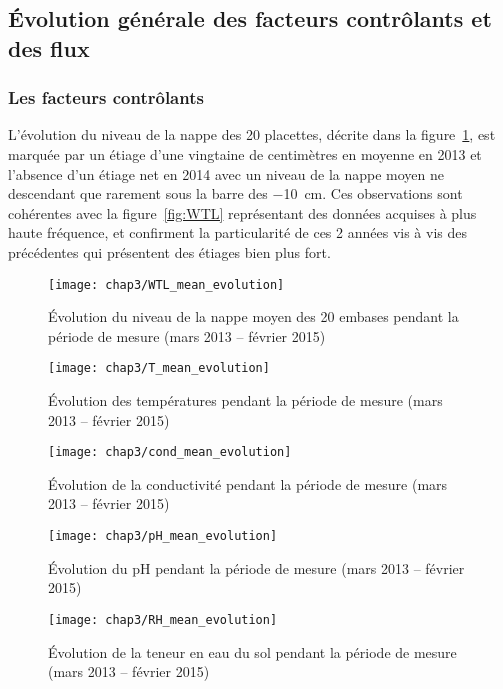 \subsection{Évolution générale des facteurs contrôlants et des flux}

\subsubsection{Les facteurs contrôlants}

L'évolution du niveau de la nappe des 20 placettes, décrite dans la figure~\ref{fig:WTL_mean_evolution}, est marquée par un étiage d'une vingtaine de centimètres en moyenne en 2013 et l'absence d'un étiage net en 2014 avec un niveau de la nappe moyen ne descendant que rarement sous la barre des \SI{-10}{\cm}.
Ces observations sont cohérentes avec la figure~\ref{fig:WTL} représentant des données acquises à plus haute fréquence, et confirment la particularité de ces 2 années vis à vis des précédentes qui présentent des étiages bien plus fort.

\begin{figure}
\centering
\texttt{[image: chap3/WTL\_mean\_evolution]}
\caption{Évolution du niveau de la nappe moyen des 20 embases pendant la période de mesure (mars 2013 -- février 2015)}
\label{fig:WTL_mean_evolution}
\end{figure}


\begin{figure}
\centering
\texttt{[image: chap3/T\_mean\_evolution]}
\caption{Évolution des températures pendant la période de mesure (mars 2013 -- février 2015)}
\label{fig:T_mean_evolution}
\end{figure}


\begin{figure}
\centering
\texttt{[image: chap3/cond\_mean\_evolution]}
\caption{Évolution de la conductivité pendant la période de mesure (mars 2013 -- février 2015)}
\label{fig:cond_mean_evolution}
\end{figure}

\begin{figure}
\centering
\texttt{[image: chap3/pH\_mean\_evolution]}
\caption{Évolution du pH pendant la période de mesure (mars 2013 -- février 2015)}
\label{fig:pH_mean_evolution}
\end{figure}


\begin{figure}
\centering
\texttt{[image: chap3/RH\_mean\_evolution]}
\caption{Évolution de la teneur en eau du sol pendant la période de mesure (mars 2013 -- février 2015)}
\label{fig:RH_mean_evolution}
\end{figure}
